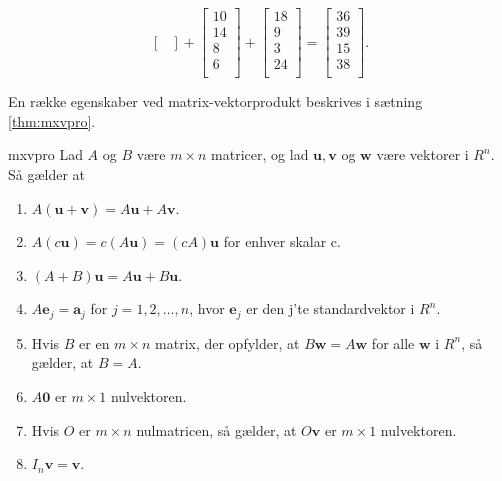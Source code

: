 \begin{eks}
$$\begin{bmatrix}
\end{bmatrix}
+
\begin{bmatrix}
10\\
14\\
8\\
6\\
\end{bmatrix}
+
\begin{bmatrix}
18\\
9\\
3\\
24\\
\end{bmatrix}
=
\begin{bmatrix}
36\\
39\\
15\\
38\\
\end{bmatrix}.
$$
\end{eks}
% 
En række egenskaber ved matrix-vektorprodukt beskrives i sætning \ref{thm:mxvpro}.
%
\begin{thm}{}{mxvpro}
Lad $A$ og $B$ være $m \times n$ matricer, og lad $\mathbf{u}, \mathbf{v}$ og $\mathbf{w}$ være vektorer i $R^n$. Så gælder at
\begin{enumerate}[label=(\alph*)]
\item $A(\mathbf{u}+\mathbf{v})=A\mathbf{u}+A\mathbf{v}$.
\item $A(c\mathbf{u})=c(A\mathbf{u})=(cA)\mathbf{u}$ for enhver skalar c.
\item $(A+B)\mathbf{u}=A\mathbf{u}+B\mathbf{u}$.
\item $A\mathbf{e}_j=\mathbf{a}_j$ for $j=1,2,\ldots,n$, hvor $\mathbf{e}_j$ er den j'te standardvektor i $R^n$.
\item Hvis $B$ er en $m \times n$ matrix, der opfylder, at $B\mathbf{w}=A\mathbf{w}$ for alle $\mathbf{w}$ i $R^n$, så gælder, at $B=A$.
\item $A\mathbf{0}$ er $m \times 1$ nulvektoren.
\item Hvis $O$ er $m \times n$ nulmatricen, så gælder, at $O\mathbf{v}$ er $m \times 1$ nulvektoren.
\item $I_n\mathbf{v}=\mathbf{v}$.
\end{enumerate}
\end{thm}

